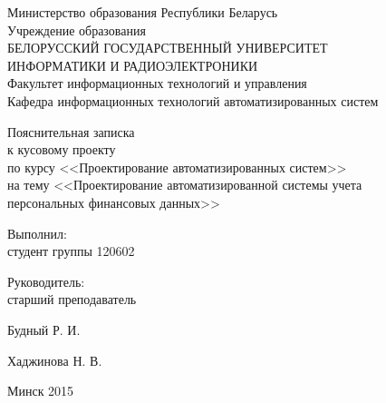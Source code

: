 \begin{titlepage}
\thispagestyle{empty}
\setlength{\parindent}{0mm} %

\begin{center}
  Министерство образования Республики Беларусь \\
  \smallskip
  Учреждение образования \\
  БЕЛОРУССКИЙ ГОСУДАРСТВЕННЫЙ УНИВЕРСИТЕТ \\
  ИНФОРМАТИКИ И РАДИОЭЛЕКТРОНИКИ \\
  \smallskip
  Факультет информационных технологий и управления \\
  \smallskip
  Кафедра информационных технологий автоматизированных систем
\end{center}

\vspace{50mm}

\begin{center}
  Пояснительная записка \\
  к кусовому проекту \\
  по курсу <<Проектирование автоматизированных систем>> \\
  на тему
  <<Проектирование автоматизированной системы учета \\
  персональных финансовых данных>> \\
\end{center}

\vspace{20mm}

\begin{minipage}{.65\linewidth}
    Выполнил: \\
    студент группы 120602

    \bigskip

    Руководитель: \\
    старший преподаватель
\end{minipage}
\hfill
\begin{minipage}{.25\linewidth}
  \vspace{6mm}
  Будный Р. И.

  \vspace{12mm}
  Хаджинова Н. В.
\end{minipage}

\vspace{45mm}
\begin{center}
  Минск 2015
\end{center}

\setlength{\parindent}{5ex} %
\end{titlepage}